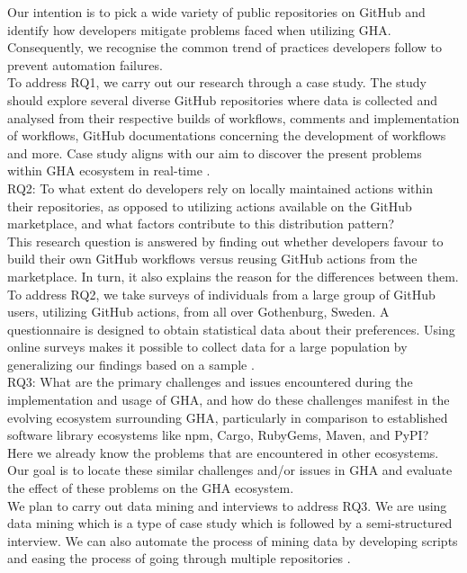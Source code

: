 \documentclass[conference]{IEEEtran}
\begin{document}
        Our intention is to pick a wide variety of public repositories on GitHub and identify how developers mitigate problems faced when utilizing GHA. Consequently, we recognise the common trend of practices developers follow to prevent automation failures. \\

To address RQ1, we carry out our research through a case study. The study should explore several diverse GitHub repositories where data is collected and analysed from their respective builds of workflows, comments and implementation of workflows, GitHub documentations concerning the development of workflows and more. Case study aligns with our aim to discover the present problems within GHA ecosystem in real-time \cite{b18}.\\

RQ2: To what extent do developers rely on locally maintained actions within their repositories, as opposed to utilizing actions available on the GitHub marketplace, and what factors contribute to this distribution pattern?\\
	
This research question is answered by finding out whether developers favour to build their own GitHub workflows versus reusing GitHub actions from the marketplace. In turn, it also explains the reason for the differences between them.\\

To address RQ2, we take surveys of individuals from a large group of GitHub users, utilizing GitHub actions, from all over Gothenburg, Sweden. A questionnaire is designed to obtain statistical data about their preferences. Using online surveys makes it possible to collect data for a large population by generalizing our findings based on a sample \cite{b19}.\\

RQ3: What are the primary challenges and issues encountered during the implementation and usage of GHA, and how do these challenges manifest in the evolving ecosystem surrounding GHA, particularly in comparison to established software library ecosystems like npm, Cargo, RubyGems, Maven, and PyPI?\\

	Here we already know the problems that are encountered in other ecosystems. Our goal is to locate these similar challenges and/or issues in GHA and evaluate the effect of these problems on the GHA ecosystem.\\

	We plan to carry out data mining and interviews to address RQ3. We are using data mining which is  a type of case study which is followed by a semi-structured interview. We can also automate the process of mining data by developing scripts and easing the process of going through multiple repositories \cite{b20}.\\
\end{document}
